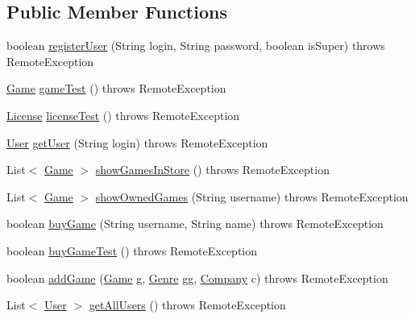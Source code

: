 \subsection*{Public Member Functions}
\begin{DoxyCompactItemize}
\item 
boolean \hyperlink{interfacees_1_1deusto_1_1server_1_1remote_1_1_i_remote_af5be134b00959135119e13a5980a4364}{register\+User} (String login, String password, boolean is\+Super)  throws Remote\+Exception
\item 
\hyperlink{classes_1_1deusto_1_1server_1_1db_1_1data_1_1_game}{Game} \hyperlink{interfacees_1_1deusto_1_1server_1_1remote_1_1_i_remote_a253273caee8c2bceaa3b03922b2e3108}{game\+Test} ()  throws Remote\+Exception
\item 
\hyperlink{classes_1_1deusto_1_1server_1_1db_1_1data_1_1_license}{License} \hyperlink{interfacees_1_1deusto_1_1server_1_1remote_1_1_i_remote_a58d270fcac4cf9bc4ccd7fb45dd92753}{license\+Test} ()  throws Remote\+Exception
\item 
\hyperlink{classes_1_1deusto_1_1server_1_1db_1_1data_1_1_user}{User} \hyperlink{interfacees_1_1deusto_1_1server_1_1remote_1_1_i_remote_a011f0eb1977e978bddb8ef1a385221ed}{get\+User} (String login)  throws Remote\+Exception
\item 
List$<$ \hyperlink{classes_1_1deusto_1_1server_1_1db_1_1data_1_1_game}{Game} $>$ \hyperlink{interfacees_1_1deusto_1_1server_1_1remote_1_1_i_remote_a091249da31b567c1be29e07085d3ff18}{show\+Games\+In\+Store} ()  throws Remote\+Exception
\item 
List$<$ \hyperlink{classes_1_1deusto_1_1server_1_1db_1_1data_1_1_game}{Game} $>$ \hyperlink{interfacees_1_1deusto_1_1server_1_1remote_1_1_i_remote_aaaf6af5906c81cbd7b3b190a70ead98b}{show\+Owned\+Games} (String username)  throws Remote\+Exception
\item 
boolean \hyperlink{interfacees_1_1deusto_1_1server_1_1remote_1_1_i_remote_ad2e6ee616bdc780b4057e63bf2ae8be7}{buy\+Game} (String username, String name)  throws Remote\+Exception
\item 
boolean \hyperlink{interfacees_1_1deusto_1_1server_1_1remote_1_1_i_remote_af921e33b96b8dac2b1b62a5e16c2952b}{buy\+Game\+Test} ()  throws Remote\+Exception
\item 
boolean \hyperlink{interfacees_1_1deusto_1_1server_1_1remote_1_1_i_remote_a1875223271b9ce7a29a835fee12e735b}{add\+Game} (\hyperlink{classes_1_1deusto_1_1server_1_1db_1_1data_1_1_game}{Game} g, \hyperlink{classes_1_1deusto_1_1server_1_1db_1_1data_1_1_genre}{Genre} gg, \hyperlink{classes_1_1deusto_1_1server_1_1db_1_1data_1_1_company}{Company} c)  throws Remote\+Exception
\item 
List$<$ \hyperlink{classes_1_1deusto_1_1server_1_1db_1_1data_1_1_user}{User} $>$ \hyperlink{interfacees_1_1deusto_1_1server_1_1remote_1_1_i_remote_a0ef7c091b38259be1d5ea89a2bda14e1}{get\+All\+Users} ()  throws Remote\+Exception
\end{DoxyCompactItemize}


